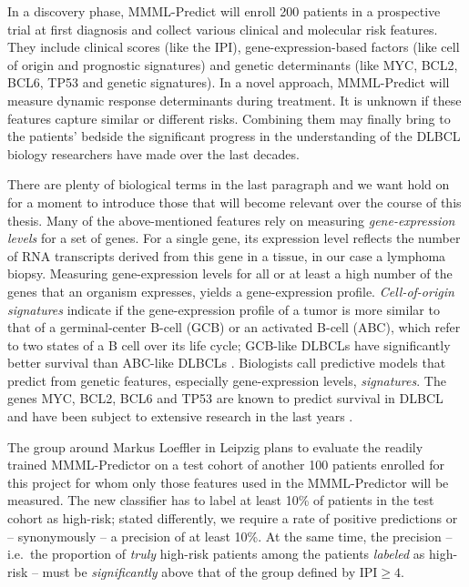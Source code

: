 In a discovery phase, MMML-Predict will enroll \num{200} patients in a prospective trial at first 
diagnosis and collect various clinical and molecular risk features.
They include clinical scores (like the IPI), gene-expression-based factors (like cell of origin and 
prognostic signatures) and genetic determinants (like MYC, BCL2, BCL6, TP53 and genetic
signatures). 
In a novel approach, MMML-Predict will measure dynamic response determinants during treatment. It is 
unknown if these features capture similar or different 
risks. Combining them may finally bring to the patients' bedside the significant progress in the 
understanding of the DLBCL biology researchers have made over the last decades.

There are plenty of biological terms in the last paragraph and we want hold on for a moment to 
introduce those that will become relevant over the course of this thesis.
Many of the above-mentioned features rely on measuring \textit{gene-expression levels} for a set 
of genes. 
For a single gene, its expression level reflects the number of RNA transcripts derived from 
this gene in a tissue, in our case a lymphoma biopsy. Measuring gene-expression levels for all 
or at least a high number of the genes that an organism expresses, yields a gene-expression 
profile. \textit{Cell-of-origin signatures} indicate if the gene-expression profile 
of a tumor is more similar to that of a germinal-center B-cell (GCB) or an activated B-cell (ABC), 
which refer to two states of a B cell over its life cycle; GCB-like DLBCLs have 
significantly better survival than ABC-like DLBCLs \cite{abc-gcb00}.
Biologists call predictive models that 
predict from genetic features, especially gene-expression levels, \textit{signatures}. The genes 
MYC, BCL2, BCL6 and TP53 are known to predict survival in DLBCL and have been subject to 
extensive research in the last years
\cite{hummel06, zenz17, aukema11, horn13, johnson09, klapper08, kretzmer15, rosenwald19}.

The group around Markus Loeffler in Leipzig plans to evaluate the readily trained MMML-Predictor on 
a test cohort of another \num{100} patients enrolled for this project for whom only those features 
used in the MMML-Predictor will be measured. The new classifier has to label at least \num{10}\% of 
patients in the test cohort as high-risk; stated differently, we require a rate of positive 
predictions or -- synonymously -- a precision of at least \num{10}\%. At the same time, the 
precision -- i.e.\ the proportion of \textit{truly} high-risk patients among the patients 
\textit{labeled} as high-risk -- must be \textit{significantly} above that of the group defined by
$\text{IPI} \geq 4$. 

